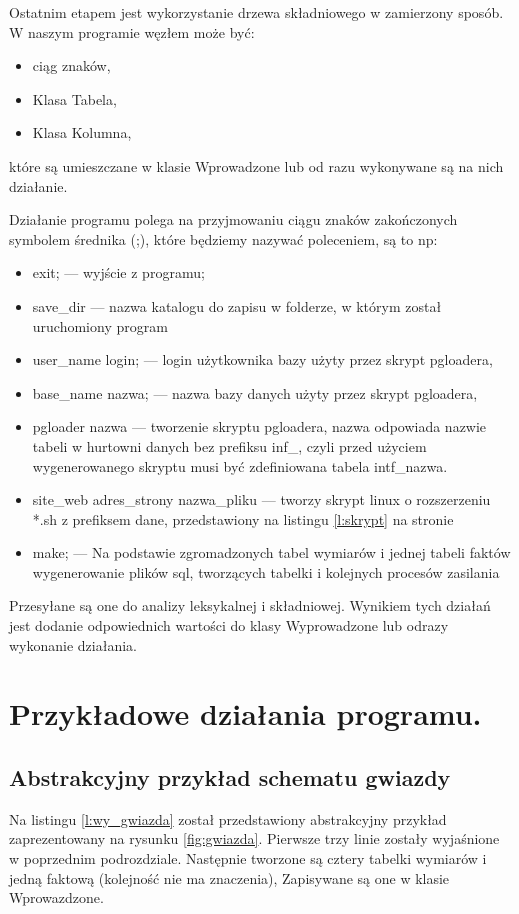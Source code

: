 Ostatnim etapem jest wykorzystanie drzewa składniowego w zamierzony sposób.
W naszym programie węzłem może być:

 \begin{itemize}
  \item ciąg znaków,
  \item Klasa Tabela,
  \item Klasa Kolumna,
 \end{itemize}
które są umieszczane w klasie Wprowadzone lub od razu wykonywane są na nich działanie.

Działanie programu polega na przyjmowaniu ciągu znaków zakończonych symbolem średnika (;),
 które będziemy nazywać poleceniem, są to np:
\begin{itemize}
 \item exit; --- 
    wyjście z programu;
 \item save\_dir --- 
    nazwa katalogu do zapisu w folderze,
    w którym został uruchomiony program
 \item user\_name  login;  ---
    login użytkownika bazy użyty przez skrypt pgloadera,
 \item base\_name nazwa; ---
    nazwa bazy danych użyty przez skrypt pgloadera,
 \item pgloader nazwa --- 
    tworzenie skryptu pgloadera, nazwa odpowiada nazwie tabeli w hurtowni danych bez prefiksu inf\_, czyli przed użyciem 
    wygenerowanego skryptu musi być zdefiniowana tabela intf\_nazwa.
 \item site\_web adres\_strony  nazwa\_pliku ---
    tworzy skrypt linux o rozszerzeniu *.sh z prefiksem dane, 
    przedstawiony na listingu \ref{l:skrypt} na stronie \pageref{l:skrypt}
 \item make; ---
   Na podstawie zgromadzonych tabel wymiarów 
   i jednej tabeli faktów wygenerowanie plików sql, tworzących tabelki i kolejnych procesów zasilania 
\end{itemize}
Przesyłane są one do analizy leksykalnej i składniowej.
Wynikiem tych działań jest dodanie odpowiednich wartości do klasy Wyprowadzone 
lub odrazy wykonanie działania. 

 
\section{Przykładowe działania programu.}

\subsection{Abstrakcyjny przykład schematu gwiazdy}
Na listingu \ref{l:wy_gwiazda} został przedstawiony abstrakcyjny przykład zaprezentowany na rysunku \ref{fig:gwiazda}.
Pierwsze trzy linie zostały wyjaśnione w poprzednim podrozdziale. 
Następnie tworzone są cztery tabelki wymiarów i jedną faktową
 (kolejność nie ma znaczenia),
Zapisywane są one w klasie Wprowazdzone.

